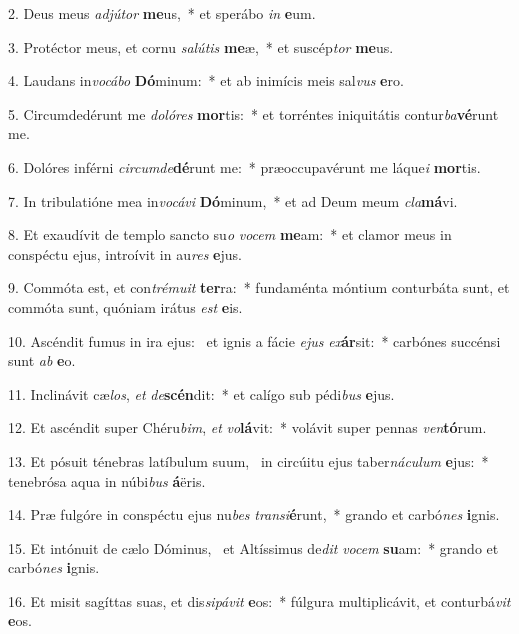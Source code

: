 2. Deus meus \textit{ad}\textit{jú}\textit{tor} \textbf{me}us,~*  et sperábo \textit{in} \textbf{e}um.\

3. Protéctor meus, et cornu \textit{sa}\textit{lú}\textit{tis} \textbf{me}æ,~*  et suscép\textit{tor} \textbf{me}us.\

4. Laudans in\textit{vo}\textit{cá}\textit{bo} \textbf{Dó}minum:~*  et ab inimícis meis sal\textit{vus} \textbf{e}ro.\

5. Circumdedérunt me \textit{do}\textit{ló}\textit{res} \textbf{mor}tis:~*  et torréntes iniquitátis contur\textit{ba}\textbf{vé}runt me.\

6. Dolóres inférni \textit{cir}\textit{cum}\textit{de}\textbf{dé}runt me:~*  præoccupavérunt me láque\textit{i} \textbf{mor}tis.\

7. In tribulatióne mea in\textit{vo}\textit{cá}\textit{vi} \textbf{Dó}minum,~*  et ad Deum meum \textit{cla}\textbf{má}vi.\

8. Et exaudívit de templo sancto su\textit{o} \textit{vo}\textit{cem} \textbf{me}am:~*  et clamor meus in conspéctu ejus, introívit in au\textit{res} \textbf{e}jus.\

9. Commóta est, et con\textit{tré}\textit{mu}\textit{it} \textbf{ter}ra:~*  fundaménta móntium conturbáta sunt, et commóta sunt, quóniam irátus \textit{est} \textbf{e}is.\

10. Ascéndit fumus in ira ejus: \dag\  et ignis a fácie \textit{e}\textit{jus} \textit{ex}\textbf{ár}sit:~*  carbónes succénsi sunt \textit{ab} \textbf{e}o.\

11. Inclinávit cæ\textit{los}, \textit{et} \textit{de}\textbf{scén}dit:~*  et calígo sub pédi\textit{bus} \textbf{e}jus.\

12. Et ascéndit super Chéru\textit{bim}, \textit{et} \textit{vo}\textbf{lá}vit:~*  volávit super pennas \textit{ven}\textbf{tó}rum.\

13. Et pósuit ténebras latíbulum suum, \dag\  in circúitu ejus taber\textit{ná}\textit{cu}\textit{lum} \textbf{e}jus:~*  tenebrósa aqua in núbi\textit{bus} \textbf{á}ëris.\

14. Præ fulgóre in conspéctu ejus nu\textit{bes} \textit{trans}\textit{i}\textbf{é}runt,~*  grando et carbó\textit{nes} \textbf{i}gnis.\

15. Et intónuit de cælo Dóminus, \dag\  et Altíssimus de\textit{dit} \textit{vo}\textit{cem} \textbf{su}am:~*  grando et carbó\textit{nes} \textbf{i}gnis.\

16. Et misit sagíttas suas, et dis\textit{si}\textit{pá}\textit{vit} \textbf{e}os:~*  fúlgura multiplicávit, et conturbá\textit{vit} \textbf{e}os.\

